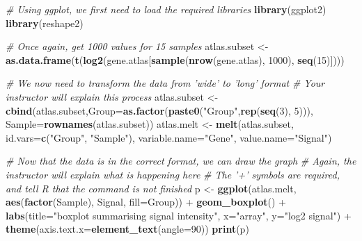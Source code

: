 \documentclass[a4paper]{book}
\newenvironment{Shaded}{\begin{snugshade}}{\end{snugshade}}
\newcommand{\KeywordTok}[1]{\textcolor[rgb]{0.13,0.29,0.53}{\textbf{{#1}}}}
\newcommand{\DataTypeTok}[1]{\textcolor[rgb]{0.13,0.29,0.53}{{#1}}}
\newcommand{\DecValTok}[1]{\textcolor[rgb]{0.00,0.00,0.81}{{#1}}}
\newcommand{\StringTok}[1]{\textcolor[rgb]{0.31,0.60,0.02}{{#1}}}
\newcommand{\CommentTok}[1]{\textcolor[rgb]{0.56,0.35,0.01}{\textit{{#1}}}}
\newcommand{\NormalTok}[1]{{#1}}
\renewenvironment{Shaded}
{\vspace{1.5em}\begin{leftbar}\begin{snugshade}}
{\end{snugshade}\end{leftbar}\vspace{3pt}}
\begin{document}
\begin{Shaded}
\begin{Highlighting}[]
\CommentTok{# Using ggplot, we first need to load the required libraries}
\KeywordTok{library}\NormalTok{(ggplot2)}
\KeywordTok{library}\NormalTok{(reshape2)}

\CommentTok{# Once again, get 1000 values for 15 samples}
\NormalTok{atlas.subset <-}\StringTok{ }\KeywordTok{as.data.frame}\NormalTok{(}\KeywordTok{t}\NormalTok{(}\KeywordTok{log2}\NormalTok{(gene.atlas[}\KeywordTok{sample}\NormalTok{(}\KeywordTok{nrow}\NormalTok{(gene.atlas), }\DecValTok{1000}\NormalTok{),}
                                                \KeywordTok{seq}\NormalTok{(}\DecValTok{15}\NormalTok{)])))}

\CommentTok{# We now need to transform the data from 'wide' to 'long' format}
\CommentTok{# Your instructor will explain this process}
\NormalTok{atlas.subset <-}\StringTok{ }\KeywordTok{cbind}\NormalTok{(atlas.subset,}\DataTypeTok{Group=}\KeywordTok{as.factor}\NormalTok{(}\KeywordTok{paste0}\NormalTok{(}\StringTok{"Group"}\NormalTok{,}\KeywordTok{rep}\NormalTok{(}\KeywordTok{seq}\NormalTok{(}\DecValTok{3}\NormalTok{), }\DecValTok{5}\NormalTok{))),}
                      \DataTypeTok{Sample=}\KeywordTok{rownames}\NormalTok{(atlas.subset))}
\NormalTok{atlas.melt <-}\StringTok{ }\KeywordTok{melt}\NormalTok{(atlas.subset,}
                   \DataTypeTok{id.vars=}\KeywordTok{c}\NormalTok{(}\StringTok{"Group"}\NormalTok{, }\StringTok{"Sample"}\NormalTok{),}
                   \DataTypeTok{variable.name=}\StringTok{"Gene"}\NormalTok{,}
                   \DataTypeTok{value.name=}\StringTok{"Signal"}\NormalTok{)}

\CommentTok{# Now that the data is in the correct format, we can draw the graph}
\CommentTok{# Again, the instructor will explain what is happening here}
\CommentTok{# The '+' symbols are required, and tell R that the command is not finished}
\NormalTok{p <-}\StringTok{ }\KeywordTok{ggplot}\NormalTok{(atlas.melt, }\KeywordTok{aes}\NormalTok{(}\KeywordTok{factor}\NormalTok{(Sample), Signal, }\DataTypeTok{fill=}\NormalTok{Group)) +}\StringTok{ }
\StringTok{  }\KeywordTok{geom_boxplot}\NormalTok{() +}\StringTok{ }
\StringTok{  }\KeywordTok{labs}\NormalTok{(}\DataTypeTok{title=}\StringTok{"boxplot summarising signal intensity"}\NormalTok{, }\DataTypeTok{x=}\StringTok{"array"}\NormalTok{, }\DataTypeTok{y=}\StringTok{"log2 signal"}\NormalTok{) +}\StringTok{ }
\StringTok{  }\KeywordTok{theme}\NormalTok{(}\DataTypeTok{axis.text.x=}\KeywordTok{element_text}\NormalTok{(}\DataTypeTok{angle=}\DecValTok{90}\NormalTok{))}
\KeywordTok{print}\NormalTok{(p)}
\end{Highlighting}
\end{Shaded}
\end{document}
